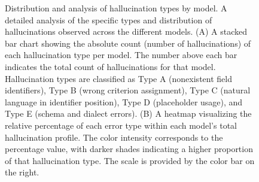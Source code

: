 \documentclass[10pt,twocolumn]{article}
\begin{document}
\begin{figure}[!t]
\caption{Distribution and analysis of hallucination types by model. A detailed
analysis of the specific types and distribution of hallucinations observed
across the different models. (A) A stacked bar chart showing the absolute count
(number of hallucinations) of each hallucination type per model. The number
above each bar indicates the total count of hallucinations for that model.
Hallucination types are classified as Type A (nonexistent field identifiers),
Type B (wrong criterion assignment), Type C (natural language in identifier
position), Type D (placeholder usage), and Type E (schema and dialect errors).
(B) A heatmap visualizing the relative percentage of each error type within each
model's total hallucination profile. The color intensity corresponds to the
percentage value, with darker shades indicating a higher proportion of that
hallucination type. The scale is provided by the color bar on the right.}
\label{fig:halluc}
\centering
\vspace{2pt}


\end{figure}
\end{document}
